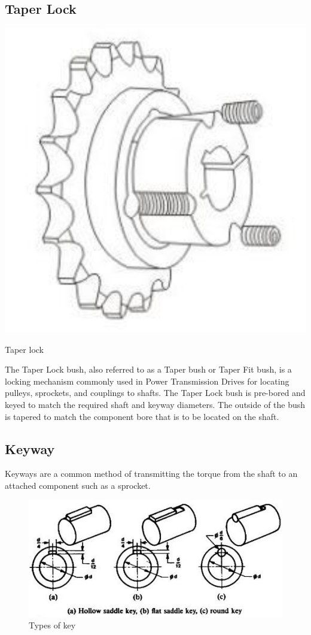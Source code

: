 \subsection{Taper Lock} 

\begin{marginfigure}
  \centering
  \includegraphics[width=\textwidth]{figs/taper-lock.png}
  \caption{Taper lock}
\end{marginfigure}
The Taper Lock bush, also referred to as a Taper bush or Taper Fit bush, is a locking mechanism commonly used in Power Transmission Drives for locating pulleys, sprockets, and couplings to shafts. 
The Taper Lock bush is pre-bored and keyed to match the required shaft and keyway diameters. 
The outside of the bush is tapered to match the component bore that is to be located on the shaft.

\subsection{Keyway} 

Keyways are a common method of transmitting the torque from the shaft to an attached component such as a sprocket.

\begin{figure}[h!]
  \centering
  \includegraphics[width=\textwidth]{figs/keys.jpg}
  \caption{Types of key}
\end{figure}

